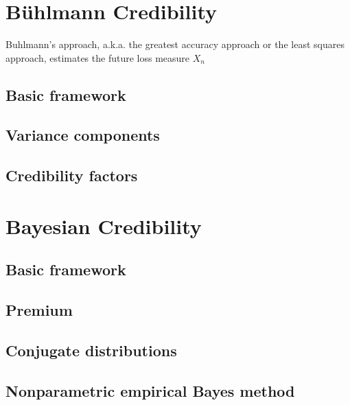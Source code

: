 \documentclass[english]{article}
\begin{document}
\begin{multicols*}{2}
\newpage
\section{Bühlmann Credibility}\label{sec:Buhl}
\begin{rappel_enhanced}[Context]
Buhlmann's approach, a.k.a. the greatest accuracy approach or the least squares approach, estimates the future loss measure $X_{n }$
\end{rappel_enhanced}
\subsection{Basic framework}

 

\subsection{Variance components}



\subsection{Credibility factors}



\newpage
\section{Bayesian Credibility}\label{sec:Bayes}
\subsection{Basic framework}


\subsection{Premium}



\subsection{Conjugate distributions}

\subsection{Nonparametric empirical Bayes method}





\end{multicols*}
\end{document}
